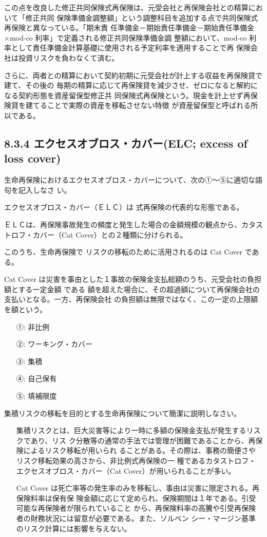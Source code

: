 \documentclass[report,gutter=10mm,fore-edge=10mm,uplatex,dvipdfmx]{jlreq}
\begin{document}
この点を改良した修正共同保険式再保険は、元受会社と再保険会社との精算において「修正共同
保険準備金調整額」という調整科目を追加する点で共同保険式再保険と異なっている。「期末責
任準備金－期始責任準備金－期始責任準備金×mod-co 利率」で定義される修正共同保険準備金調
整額において、mod-co 利率として責任準備金計算基礎に使用される予定利率を適用することで再
保険会社は投資リスクを負わなくて済む。

さらに、両者との精算において契約初期に元受会社が計上する収益を再保険貸で建て、その後の
毎期の精算に応じて再保険貸を減少させ、ゼロになると解約になる契約形態を資産留保型修正共
同保険式再保険という。現金を計上せず再保険貸を建てることで実際の資産を移転させない特徴
が資産留保型と呼ばれる所以である。

\subsection{8.3.4 エクセスオブロス・カバー(ELC; excess of loss cover)}

生命再保険におけるエクセスオブロス・カバーについて、次の①～⑤に適切な語句を記入しなさ
い。

エクセスオブロス・カバー（ＥＬＣ）は
式再保険の代表的な形態である。

ＥＬＣは、再保険事故発生の頻度と発生した場合の金額規模の観点から、カタストロフ・カバー（Cat
Cover）との２種類に分けられる。

このうち、生命再保険で
リスクの移転のために活用されるのは Cat Cover である。

Cat Cover は災害を事由とした１事故の保険金支払総額のうち、元受会社の負担額とする一定金額
である
額を超えた場合に、その超過額について再保険会社の支払いとなる。一方、再保険会社
の負担額は無限ではなく、この一定の上限額を額という。

\answer{}
\begin{itemize}
\item[ ①: ]  非比例 
\item[ ②: ]  ワーキング・カバー 
\item[ ③: ]  集積 
\item[ ④: ]  自己保有 
\item[ ⑤: ]  填補限度
\end{itemize}

集積リスクの移転を目的とする生命再保険について簡潔に説明しなさい。
\answer{}
\begin{itemize}
\item[] 集積リスクとは、巨大災害等により一時に多額の保険金支払が発生するリスクであり、リス
 ク分散等の通常の手法では管理が困難であることから、再保険によるリスク移転が用いられ
 ることがある。その際は、事務の簡便さやリスク移転効果の高さから、非比例式再保険の一
 種であるカタストロフ・エクセスオブロス・カバー（Cat Cover）が用いられることが多い。
\item[] Cat Cover は死亡率等の発生率のみを移転し、事由は災害に限定される。再保険料率は保有保
 険金額に応じて定められ、保険期間は１年である。引受可能な再保険者が限られていること
 から、再保険料率の高騰や引受再保険者の財務状況には留意が必要である。また、ソルベン
 シー・マージン基準のリスク計算には影響を与えない。
\end{itemize}
\end{document}
